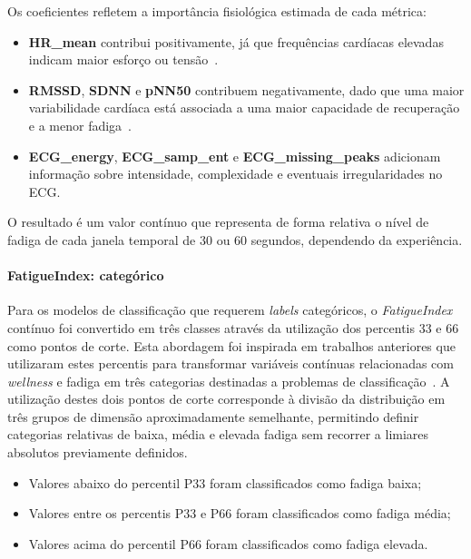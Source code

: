 Os coeficientes refletem a importância fisiológica estimada de cada métrica:

\begin{itemize}
\item \textbf{HR\_mean} contribui positivamente, já que frequências cardíacas elevadas indicam maior esforço ou tensão~\cite{marcora2009}.
\item \textbf{RMSSD}, \textbf{SDNN} e \textbf{pNN50} contribuem negativamente, dado que uma maior variabilidade cardíaca está associada a uma maior capacidade de recuperação e a menor fadiga~\cite{pichot2002}.
\item \textbf{ECG\_energy}, \textbf{ECG\_samp\_ent} e \textbf{ECG\_missing\_peaks} adicionam informação sobre intensidade, complexidade e eventuais irregularidades no ECG.
\end{itemize}

O resultado é um valor contínuo que representa de forma relativa o nível de fadiga de cada janela temporal de 30 ou 60 segundos, dependendo da experiência.

\paragraph{FatigueIndex: categórico}

Para os modelos de classificação que requerem \textit{labels} categóricos, o \textit{FatigueIndex} contínuo foi convertido em três classes através da utilização dos percentis 33 e 66 como pontos de corte. Esta abordagem foi inspirada em trabalhos anteriores que utilizaram estes percentis para transformar variáveis contínuas relacionadas com \textit{wellness} e fadiga em três categorias destinadas a problemas de classificação~\cite{rossi2022wellness}. A utilização destes dois pontos de corte corresponde à divisão da distribuição em três grupos de dimensão aproximadamente semelhante, permitindo definir categorias relativas de baixa, média e elevada fadiga sem recorrer a limiares absolutos previamente definidos.

\begin{itemize}
\item Valores abaixo do percentil P33 foram classificados como fadiga baixa;
\item Valores entre os percentis P33 e P66 foram classificados como fadiga média;
\item Valores acima do percentil P66 foram classificados como fadiga elevada.
\end{itemize}

